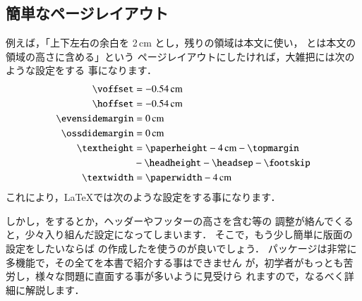 \begin{InTeX}
\setlength{\textwidth}{33zw}
\setlength{\textheight}{40\baselineskip}
\end{InTeX}



\subsection{簡単なページレイアウト\zdash {}}
%
%

例えば，「上下左右の余白を 2\,cm とし，残りの領域は本文に使い，
とは本文の領域の高さに含める」という
ページレイアウトにしたければ，大雑把には次のような設定をする
事になります．
\begin{eqnarray*}
 \begin{aligned}
 \cmd{voffset}        & = -0.54\,\mathrm{cm} \\
 \cmd{hoffset}        & = -0.54\,\mathrm{cm} \\
 \cmd{evensidemargin} & = 0\,\mathrm{cm} \\ 
 \cmd{ossdidemargin}  & = 0\,\mathrm{cm} \\
 \cmd{textheight} 
   & = \cmd{paperheight} - 4\,\mathrm{cm} - \cmd{topmargin} \\
   & - \cmd{headheight} - \cmd{headsep} - \cmd{footskip}  \\
 \cmd{textwidth}   & = \cmd{paperwidth} - 4\,\mathrm{cm}  
 \end{aligned}
\end{eqnarray*}
これにより，\LaTeX では次のような設定をする事になります．

\begin{InTeX}
\setlength   \voffset        {-1in}%
\addtolength \voffset        {2cm}
\setlength   \hoffset        {-1in}%
\addtolength \hoffset        {2cm}
\setlength   \textheight     {\paperheight}%
\addtolength \textheight     {-4cm}
\addtolength \textheight     {-\topmargin}
\addtolength \textheight     {-\headheight}
\addtolength \textheight     {-\headsep}
\addtolength \textheight     {-\footskip}
\setlength   \textwidth      {\paperwidth}%
\addtolength \textwidth      {-4cm}
\setlength   \evensidemargin {0pt}%
\setlength   \oddsidemargin  {\evensidemargin}%
\setlength   \fullwidth      {\textwidth} 
\end{InTeX}

%
しかし，をするとか，ヘッダーやフッターの高さを含む等の
調整が絡んでくると，少々入り組んだ設定になってしまいます．
そこで，もう少し簡単に版面の設定をしたいならば
の作成したを使うのが良いでしょう．
パッケージは非常に多機能で，その全てを本書で紹介する事はできません
が，初学者がもっとも苦労し，様々な問題に直面する事が多いように見受けら
れますので，なるべく詳細に解説します．

